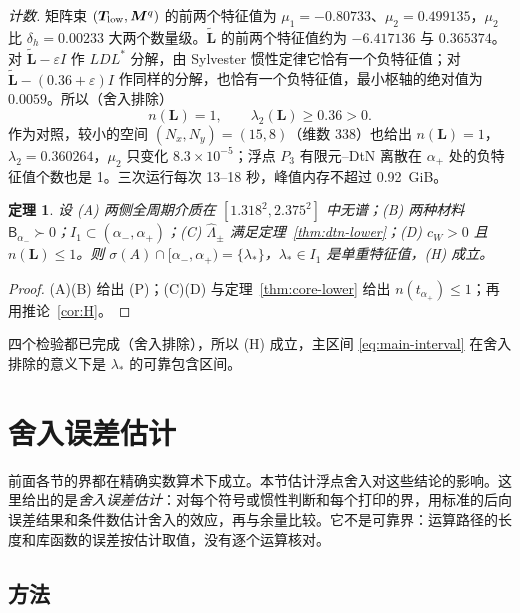 \documentclass[11pt,a4paper,fontset=fandol]{ctexart}
\theoremstyle{plain}
\newtheorem{theorem}{定理}[section]
\theoremstyle{definition}
\theoremstyle{remark}
\begin{document}
\emph{计数.} 矩阵束 $(\bm T_{\rm low},\bm M^q)$ 的前两个特征值为 $\mu_1=-0.80733$、$\mu_2=0.499135$，$\mu_2$ 比 $\delta_h=0.00233$ 大两个数量级。$\tilde{\bm L}$ 的前两个特征值约为 $-6.417136$ 与 $0.365374$。对 $\tilde{\bm L}-\varepsilon I$ 作 $LDL^*$ 分解，由 Sylvester 惯性定律它恰有一个负特征值；对 $\tilde{\bm L}-(0.36+\varepsilon)I$ 作同样的分解，也恰有一个负特征值，最小枢轴的绝对值为 $0.0059$。所以（舍入排除）
\[
n(\bm L)=1,\qquad\lambda_2(\bm L)\ge0.36>0 .
\]
作为对照，较小的空间 $(N_x,N_y)=(15,8)$（维数 338）也给出 $n(\bm L)=1$，$\lambda_2=0.360264$，$\mu_2$ 只变化 $8.3\times10^{-5}$；浮点 $P_3$ 有限元--DtN 离散在 $\alpha_+$ 处的负特征值个数也是 1。三次运行每次 13--18 秒，峰值内存不超过 0.92~GiB。

\begin{theorem}
\label{thm:H-final}
设 (A) 两侧全周期介质在 $[1.318^2,2.375^2]$ 中无谱；(B) 两种材料 $\mathsf B_{\alpha_-}\succ0$；$I_1\subset(\alpha_-,\alpha_+)$；(C) $\hat\Lambda_\pm$ 满足定理~\ref{thm:dtn-lower}；(D) $c_W>0$ 且 $n(\bm L)\le1$。则 $\sigma(A)\cap[\alpha_-,\alpha_+)=\{\lambda_*\}$，$\lambda_*\in I_1$ 是单重特征值，(H) 成立。
\end{theorem}

\begin{proof}
(A)(B) 给出 (P)；(C)(D) 与定理~\ref{thm:core-lower} 给出 $n(t_{\alpha_+})\le1$；再用推论~\ref{cor:H}。
\end{proof}

四个检验都已完成（舍入排除），所以 (H) 成立，主区间 \eqref{eq:main-interval} 在舍入排除的意义下是 $\lambda_*$ 的可靠包含区间。

\section{舍入误差估计}
\label{sec:rounding}
前面各节的界都在精确实数算术下成立。本节估计浮点舍入对这些结论的影响。这里给出的是\emph{舍入误差估计}：对每个符号或惯性判断和每个打印的界，用标准的后向误差结果和条件数估计舍入的效应，再与余量比较。它不是可靠界：运算路径的长度和库函数的误差按估计取值，没有逐个运算核对。

\subsection{方法}
\end{document}
